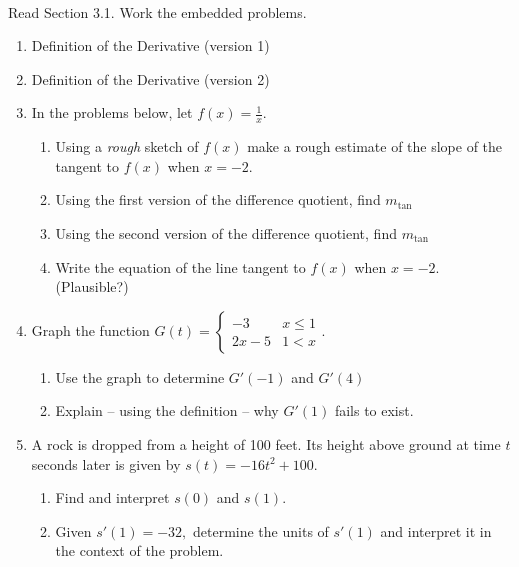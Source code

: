 \documentclass[11pt,fleqn]{article}
\begin{document}
\renewcommand{\headrulewidth}{0pt}
\newcommand{\blank}[1]{\rule{#1}{0.75pt}}
\newcommand{\bc}{\begin{center}}
\newcommand{\ec}{\end{center}}
\renewcommand{\d}{\displaystyle}

\vspace*{-0.7in}

\begin{center}
  \large
  \\
\end{center}
Read Section 3.1. Work the embedded problems. \\
\hrulefill

\begin{enumerate}
\item Definition of the Derivative (version 1) 
\vspace{0.7in}

\item Definition of the Derivative (version 2)
\vspace{0.7in}

\item In the problems below, let $f(x)=\frac{1}{x}.$
\begin{enumerate}
	\item Using a \emph{rough} sketch of $f(x)$ make a rough estimate of the slope of the tangent to $f(x)$ when $x=-2.$
	\vfill
	\item Using the first version of the difference quotient, find $m_{\text{tan}}$
	\vspace{2in}
	\item Using the second version of the difference quotient, find $m_{\text{tan}}$
	\vspace{2in}
	\item Write the equation of the line tangent to $f(x)$ when $x=-2$. (Plausible?)
	\vspace{.5in}
\end{enumerate}
\newpage
\item Graph the function $G(t) =\begin{cases} -3 & x \leq 1 \\ 2x-5 & 1 < x\end{cases}.$
\begin{enumerate}
	\item Use the graph to determine $G'(-1)$ and $G'(4)$
	\vfill
	\item Explain -- using the definition -- why $G'(1)$ fails to exist.
	\vfill
\end{enumerate}
\item A rock is dropped from a height of 100 feet. Its height above ground at time $t$ seconds later is given by $s(t)= -16t^2+100.$ 
	\begin{enumerate}
	\item Find and interpret $s(0)$ and $s(1).$
	\vfill
	\item Given $s'(1)=-32,$ determine the units of $s'(1)$ and interpret it in the context of the problem.
	\vfill
	\end{enumerate}
\end{enumerate}
\end{document}
